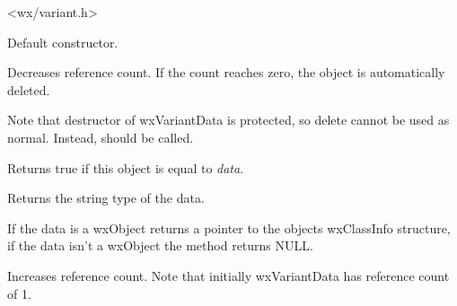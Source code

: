 
<wx/variant.h>






\label{wxvariantdatactor}


Default constructor.

\label{wxvariantdatadecref}


Decreases reference count. If the count reaches zero, the object is
automatically deleted.

Note that destructor of wxVariantData is protected, so delete
cannot be used as normal. Instead,  should be called.



\label{wxvariantdataeq}


Returns true if this object is equal to {\it data}.

\label{wxvariantdatagettype}


Returns the string type of the data.

\label{wxvariantdatagetvalueclassinfo}


If the data is a wxObject returns a pointer to the objects wxClassInfo structure, if
the data isn't a wxObject the method returns NULL.

\label{wxvariantdataincref}


Increases reference count. Note that initially wxVariantData has reference count of 1.

\label{wxvariantdataread}

